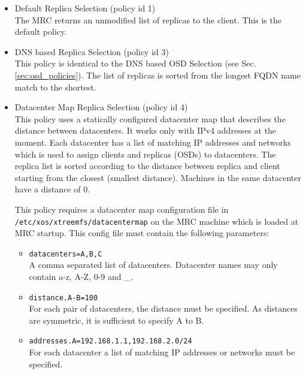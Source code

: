 \documentclass[a4paper,10pt]{book}
\begin{document}
\begin{itemize}
 \item Default Replica Selection (policy id 1)\\
       The MRC returns an unmodified list of replicas to the client. This is the default policy.

 \item DNS based Replica Selection  (policy id 3)\\
       This policy is identical to the DNS based OSD Selection (see Sec. \ref{sec:osd_policies}). The list of replicas is sorted from the longest FQDN name match to the shortest.

 \item Datacenter Map Replica Selection  (policy id 4)\\
       This policy uses a statically configured datacenter map that describes the distance between datacenters. It works only with IPv4 addresses at the moment. Each datacenter has a list of matching IP addresses and networks which is used to assign clients and replicas (OSDs) to datacenters. The replica list is sorted according to the distance between replica and client starting from the closest (smallest distance). Machines in the same datacenter have a distance of 0.

	This policy requires a datacenter map configuration file in \texttt{/etc/xos/xtreemfs/datacentermap} on the MRC machine which is loaded at MRC startup. This config file must contain the following parameters:
	\begin{itemize}
		\item \texttt{datacenters=A,B,C}\\
			A comma separated list of datacenters. Datacenter names may only contain a-z, A-Z, 0-9 and \_.

		\item \texttt{distance.A-B=100}\\
			For each pair of datacenters, the distance must be specified. As distances are symmetric, it is sufficient to specify A to B.

		\item \texttt{addresses.A=192.168.1.1,192.168.2.0/24}\\
			For each datacenter a list of matching IP addresses or networks must be specified.


\end{itemize}
\end{itemize}
\end{document}
